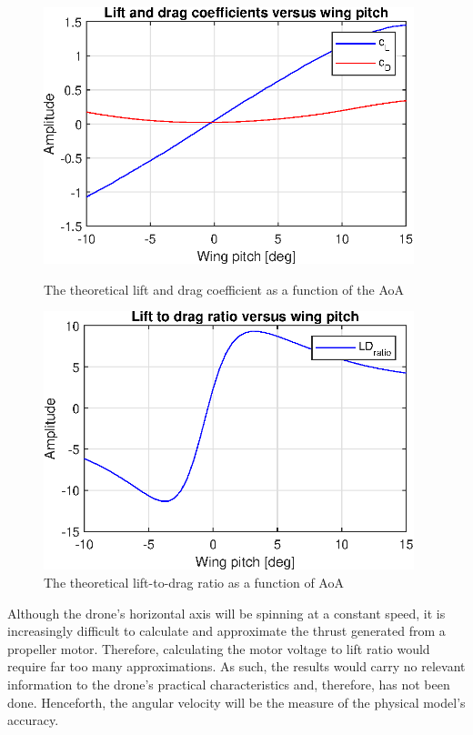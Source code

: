 \begin{figure}[h!]
    \centering
    \begin{minipage}[t]{0.48\textwidth}
        \centering
        \includegraphics[width=0.96\textwidth]{figures/control_loops/lift_drag_coefficient.eps}
        \caption{The theoretical lift and drag coefficient as a function of the AoA}
        \label{fig:liftcoefficient}
    \end{minipage}%
    \hspace{.03\textwidth}
    \begin{minipage}[t]{0.48\textwidth}
        \centering
        \includegraphics[width=0.96\textwidth]{figures/control_loops/lift_drag_ratio.eps}
        \caption{The theoretical lift-to-drag ratio as a function of AoA}
        \label{fig:LDratio}
    \end{minipage}
\end{figure} 
Although the drone's horizontal axis will be spinning at a constant speed, it is increasingly difficult to calculate and approximate the thrust generated from a propeller motor. Therefore, calculating the motor voltage to lift ratio would require far too many approximations. As such, the results would carry no relevant information to the drone's practical characteristics and, therefore, has not been done. 
Henceforth, the angular velocity will be the measure of the physical model's accuracy.

